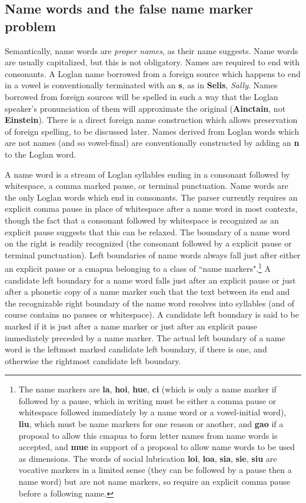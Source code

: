 \documentclass[12pt]{book}
\begin{document}
\subsection{Name words and the false name marker problem}

Semantically, name words are {\em proper names\/}, as their name suggests.  Name words are usually capitalized, but this is not obligatory.  Names are required to end with consonants.  A Loglan name borrowed from a foreign source which happens to end in a vowel is conventionally terminated with an {\bf s},
as in {\bf Selis}, {\em Sally\/}.  Names borrowed from foreign sources will be spelled in such a way that the Loglan speaker's pronunciation of them will approximate the original ({\bf Ainctain}, not {\bf Einstein}).  There is a direct foreign name construction which allows preservation of foreign spelling, to be discussed later.  Names derived from Loglan words which are not names (and so vowel-final) are conventionally constructed by adding an {\bf n} to
the Loglan word.

A name word is a stream of Loglan syllables ending in a consonant followed by whitespace, a comma marked pause, or terminal punctuation.  Name words are the only Loglan words which end in consonants.  The parser currently requires an explicit comma pause in place of whitespace after a name word in most contexts, though the fact that a consonant followed by whitespace is recognized as an explicit pause suggests that this can be relaxed.  The boundary of a name word on the right is readily recognized (the consonant followed by a explicit pause or terminal punctuation).  Left boundaries of name words always fall just after either an explicit pause or a cmapua belonging to a class of ``name markers".\footnote{The name markers are {\bf la}, {\bf hoi}, {\bf hue}, {\bf ci} (which is only a name marker if followed by a pause, which in writing must be either a comma pause or whitespace followed immediately by a name word or a vowel-initial word), {\bf liu}, which must be name markers for one reason or another, and {\bf gao} if a proposal to allow this cmapua to form letter names from name words is accepted, and {\bf mue} in support of a proposal to allow name words to be used as dimensions.  The words of social lubrication {\bf loi}, {\bf loa}, {\bf sia}, {\bf sie}, {\bf siu} are vocative markers in a limited sense (they can be followed by a pause then a name word) but are not name markers, so require an explicit comma pause before a following name.}   A candidate left boundary for a name word falls just after an explicit pause or just after a phonetic copy of a name marker such that the text between its end and the recognizable right boundary of the name word resolves into syllables (and of course contains no pauses or whitespace).   A candidate left boundary is said to be marked if it is just after a name marker  or just after an explicit pause immediately preceded by a name marker.  The actual left boundary of a name word is the leftmost marked candidate left boundary, if there is one, and otherwise the rightmost candidate left boundary.
\end{document}
